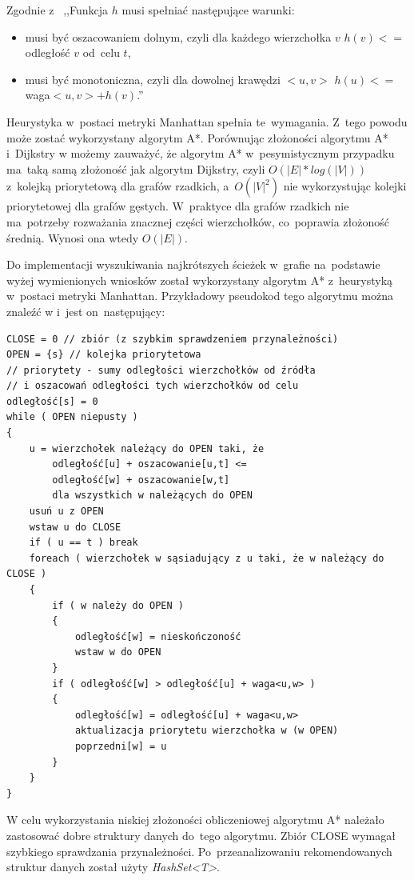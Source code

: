 \documentclass[a4paper,11pt,twoside,openright]{report}
\theoremstyle{definition}
\begin{document}
Zgodnie z~\cite{AiSD2} ,,Funkcja $h$ musi spełniać następujące warunki:

\begin{itemize}[noitemsep]
\item musi być oszacowaniem dolnym, czyli dla każdego wierzchołka $v$ $h(v) <=$ odległość $v$ od~celu $t$,
\item musi być monotoniczna, czyli dla dowolnej krawędzi $<u,v>$ $h(u) <= $waga$<u,v> + h(v)$.''
\end{itemize}

Heurystyka w~postaci metryki Manhattan spełnia te~wymagania. Z~tego powodu może
zostać wykorzystany algorytm A*. Porównując złożoności algorytmu A* i~Dijkstry w
\cite{AiSD2} możemy zauważyć, że algorytm A* w~pesymistycznym przypadku ma~taką
samą złożoność jak algorytm Dijkstry, czyli $O(|E|*log(|V|))$ z~kolejką priorytetową
dla grafów rzadkich, a~$O(|V|^2)$ nie wykorzystując kolejki priorytetowej dla
grafów gęstych. W~praktyce dla grafów rzadkich nie ma~potrzeby rozważania znacznej
części wierzchołków, co~poprawia złożoność średnią. Wynosi ona wtedy $O(|E|)$.

Do implementacji wyszukiwania najkrótszych ścieżek w~grafie na~podstawie wyżej
wymienionych wniosków został wykorzystany algorytm A* z~heurystyką w~postaci
metryki Manhattan. Przykładowy pseudokod tego algorytmu można znaleźć w
\cite{AiSD2} i~jest on~następujący:

\begin{verbatim}
CLOSE = 0 // zbiór (z szybkim sprawdzeniem przynależności)
OPEN = {s} // kolejka priorytetowa
// priorytety - sumy odległości wierzchołków od źródła
// i oszacowań odległości tych wierzchołków od celu
odległość[s] = 0
while ( OPEN niepusty )
{
    u = wierzchołek należący do OPEN taki, że
        odległość[u] + oszacowanie[u,t] <=
        odległość[w] + oszacowanie[w,t]
        dla wszystkich w należących do OPEN
    usuń u z OPEN
    wstaw u do CLOSE
    if ( u == t ) break
    foreach ( wierzchołek w sąsiadujący z u taki, że w należący do CLOSE )
    {
        if ( w należy do OPEN )
        {
            odległość[w] = nieskończoność
            wstaw w do OPEN
        }
        if ( odległość[w] > odległość[u] + waga<u,w> )
        {
            odległość[w] = odległość[u] + waga<u,w>
            aktualizacja priorytetu wierzchołka w (w OPEN)
            poprzedni[w] = u
        }
    }
}
\end{verbatim}

W celu wykorzystania niskiej złożoności obliczeniowej algorytmu A*
należało zastosować dobre struktury danych do~tego algorytmu. Zbiór CLOSE
wymagał szybkiego sprawdzania przynależności. Po~przeanalizowaniu rekomendowanych
struktur danych \cite{Dotnet struktury} został użyty \textit{HashSet<T>}.
\end{document}
